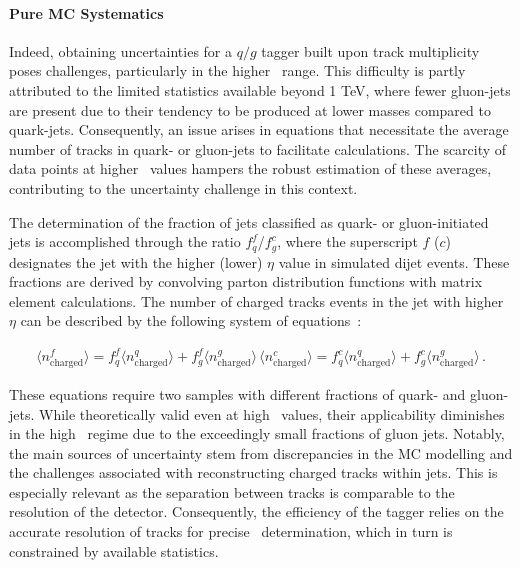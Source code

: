 \paragraph{Pure MC Systematics \\}

Indeed, obtaining uncertainties for a $q/g$ tagger built upon track multiplicity poses challenges, particularly in the higher \pt\ range. This difficulty is partly attributed to the limited statistics available beyond 1 TeV, where fewer gluon-jets are present due to their tendency to be produced at lower masses compared to quark-jets. Consequently, an issue arises in equations that necessitate the average number of tracks in quark- or gluon-jets to facilitate calculations. The scarcity of data points at higher \pt\ values hampers the robust estimation of these averages, contributing to the uncertainty challenge in this context.

The determination of the fraction of jets classified as quark- or gluon-initiated jets is accomplished through the ratio $f^f_q$/$f^c_g$, where the superscript $f$ ($c$) designates the jet with the higher (lower) $\eta$ value in simulated dijet events. These fractions are derived by convolving parton distribution functions with matrix element calculations. The number of charged tracks events in the jet with higher $\eta$ can be described by the following system of equations~\cite{ATL-PHYS-PUB-2017-009}:

\begin{eqnarray}
\langle n^f_{\mathrm{charged}} \rangle = f^f_q \langle n^q_{\mathrm{charged}}\rangle + f^f_g\langle n^g_{\mathrm{charged}}\rangle\, 
\langle n^c_{\mathrm{charged}} \rangle = f^c_q \langle n^q_{\mathrm{charged}}\rangle + f^c_g\langle n^g_{\mathrm{charged}}\rangle\, .
\end{eqnarray}

These equations require two samples with different fractions of quark- and gluon-jets. While theoretically valid even at high \pt\ values, their applicability diminishes in the high \pt\ regime due to the exceedingly small fractions of gluon jets. Notably, the main sources of uncertainty stem from discrepancies in the MC modelling and the challenges associated with reconstructing charged tracks within jets. This is especially relevant as the separation between tracks is comparable to the resolution of the detector. Consequently, the efficiency of the tagger relies on the accurate resolution of tracks for precise \ntrk\ determination, which in turn is constrained by available statistics.

